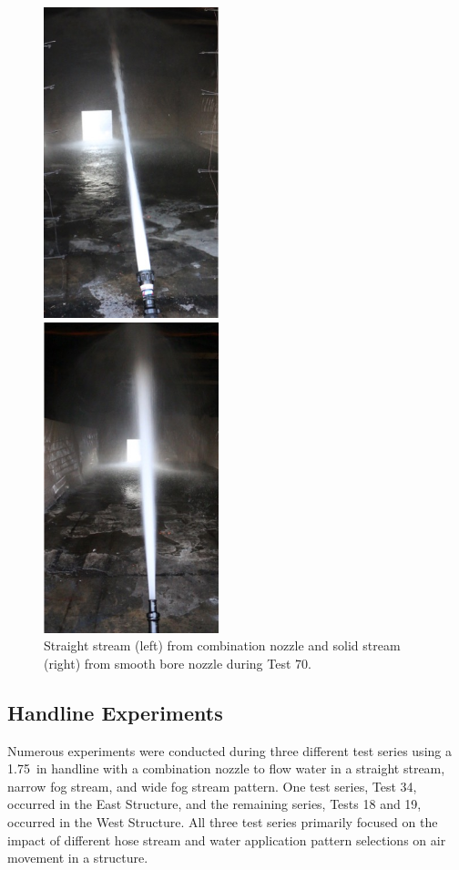 \documentclass[12pt,oneside]{book}
\begin{document}
\begin{figure}[!ht]
	\minipage{2.15in}
	\begin{center}
		\includegraphics[width=2in]{../Figures/Pictures/SS_70}
	\end{center} 
	\endminipage
	\minipage{2.15in}
	\begin{center}
		\includegraphics[width=2in]{../Figures/Pictures/SB_70}
	\end{center}
	\endminipage
	\caption[Straight stream from combination nozzle and solid stream from smooth bore nozzle during Test 70.]{Straight stream (left) from combination nozzle and solid stream (right) from smooth bore nozzle during Test 70.}
	\label{fig:test_70_pic}
\end{figure}
\FloatBarrier

\subsection{Handline Experiments}
\label{sec:handline_procedure}
Numerous experiments were conducted during three different test series using a 1.75~in handline with a combination nozzle to flow water in a straight stream, narrow fog stream, and wide fog stream pattern. One test series, Test 34, occurred in the East Structure, and the remaining series, Tests 18 and 19, occurred in the West Structure. All three test series primarily focused on the impact of different hose stream and water application pattern selections on air movement in a structure. 
\end{document}
